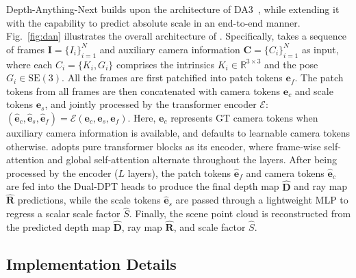 Depth-Anything-Next builds upon the architecture of DA3~\citep{lin2025depth}, while extending it with the capability to predict absolute scale in an end-to-end manner. 
%
Fig.~\ref{fig:dan} illustrates the overall architecture of \ours.
%
Specifically, \ours takes a sequence of frames $\mathbf{I} = \{I_i\}^N_{i=1}$ and auxiliary camera information $\mathbf{C} = \{C_i\}^N_{i=1}$ as input, where each $C_i=\{K_i,G_i\}$ comprises the intrinsics $K_i\in \mathbb{R}^{3\times 3}$ and the pose $G_i\in\mathrm{SE}(3)$.
%
All the frames are first patchified into patch tokens $\mathbf{e}_f$. 
%
The patch tokens from all frames are then concatenated with camera tokens $\mathbf{e}_c$ and scale tokens $\mathbf{e}_s$, and jointly processed by the transformer encoder 
$\mathcal{E}$:
%
$
(\hat{\mathbf{e}}_c,\hat{\mathbf{e}}_s,\hat{\mathbf{e}}_f)=\mathcal{E}(\mathbf{e}_c,\mathbf{e}_s,\mathbf{e}_f).
$
Here, $\mathbf{e}_c$ represents GT camera tokens when auxiliary camera information is available, and defaults to learnable camera tokens otherwise.
%
\ours adopts pure transformer blocks as its encoder, where frame-wise self-attention and global self-attention alternate throughout the layers.
%
After being processed by the encoder ($L$ layers), the patch tokens $\hat{\mathbf{e}}_f$ and camera tokens $\hat{\mathbf{e}}_c$ are fed into the Dual-DPT heads to produce the final depth map $\hat{\mathbf{D}}$ and ray map $\hat{\mathbf{R}}$ predictions, while the scale tokens $\hat{\mathbf{e}}_s$ are passed through a lightweight MLP to regress a scalar scale factor $\hat{S}$.
%
Finally, the scene point cloud is reconstructed from the predicted depth map $\hat{\mathbf{D}}$, ray map $\hat{\mathbf{R}}$, and scale factor $\hat{S}$.
%



\subsection{Implementation Details}

